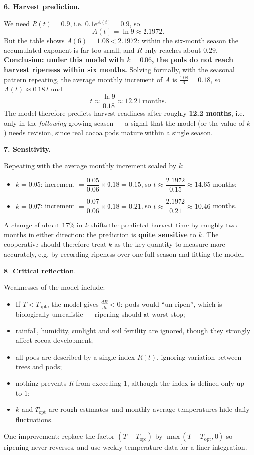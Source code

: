 \documentclass[11pt]{article}
\begin{document}
\textbf{6. Harvest prediction.}\par
We need $R(t)=0.9$, i.e. $0.1e^{A(t)}=0.9$, so
\[
A(t)=\ln 9 \approx 2.1972.
\]
But the table shows $A(6)=1.08 < 2.1972$: within the six-month season the accumulated exponent is far too small, and $R$ only reaches about $0.29$. \textbf{Conclusion: under this model with $k=0.06$, the pods do not reach harvest ripeness within six months.} Solving formally, with the seasonal pattern repeating, the average monthly increment of $A$ is $\frac{1.08}{6}=0.18$, so $A(t)\approx 0.18\,t$ and
\[
t \approx \frac{\ln 9}{0.18}\approx 12.21\ \text{months}.
\]
The model therefore predicts harvest-readiness after roughly \textbf{12.2 months}, i.e. only in the \emph{following} growing season — a signal that the model (or the value of $k$) needs revision, since real cocoa pods mature within a single season.

\textbf{7. Sensitivity.}\par
Repeating with the average monthly increment scaled by $k$:
\begin{itemize}
\item $k=0.05$: increment $=\dfrac{0.05}{0.06}\times 0.18=0.15$, so $t\approx \dfrac{2.1972}{0.15}\approx 14.65$ months;
\item $k=0.07$: increment $=\dfrac{0.07}{0.06}\times 0.18=0.21$, so $t\approx \dfrac{2.1972}{0.21}\approx 10.46$ months.
\end{itemize}
A change of about $17\%$ in $k$ shifts the predicted harvest time by roughly two months in either direction: the prediction is \textbf{quite sensitive} to $k$. The cooperative should therefore treat $k$ as the key quantity to measure more accurately, e.g. by recording ripeness over one full season and fitting the model.

\textbf{8. Critical reflection.}\par
Weaknesses of the model include:
\begin{itemize}
\item If $T<T_{\mathrm{opt}}$, the model gives $\frac{dR}{dt}<0$: pods would ``un-ripen'', which is biologically unrealistic — ripening should at worst stop;
\item rainfall, humidity, sunlight and soil fertility are ignored, though they strongly affect cocoa development;
\item all pods are described by a single index $R(t)$, ignoring variation between trees and pods;
\item nothing prevents $R$ from exceeding $1$, although the index is defined only up to $1$;
\item $k$ and $T_{\mathrm{opt}}$ are rough estimates, and monthly average temperatures hide daily fluctuations.
\end{itemize}
One improvement: replace the factor $(T-T_{\mathrm{opt}})$ by $\max(T-T_{\mathrm{opt}},0)$ so ripening never reverses, and use weekly temperature data for a finer integration.
\end{document}
